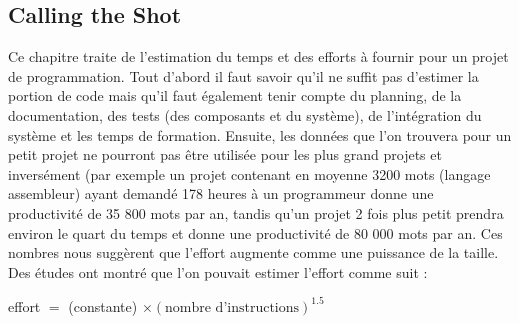 \documentclass[runningheads]{llncs}
\begin{document}
\newpage
\subsection{Calling the Shot}

Ce chapitre traite de l'estimation du temps et des efforts à fournir pour un projet de programmation. Tout d'abord il faut savoir 
qu'il ne suffit pas d'estimer la portion de code mais qu'il faut également tenir compte du planning, de la documentation, des 
tests (des composants et du système), de l'intégration du système et les temps de formation. Ensuite, les données que l'on 
trouvera pour un petit projet ne pourront pas être utilisée pour les plus grand projets et inversément (par exemple un projet 
contenant en moyenne 3200 mots (langage assembleur) ayant demandé 178 heures à un programmeur donne une productivité de 35 800 
mots par an, tandis qu'un projet 2 fois plus petit prendra environ le quart du temps et donne une productivité de 80 000 mots par 
an. Ces nombres nous suggèrent que l'effort augmente comme une puissance de la taille. Des études ont montré que l'on pouvait 
estimer l'effort comme suit : \begin{center}effort $=$ (constante) $\times (\text{nombre d'instructions})^{1.5}$\end{center}
\end{document}
